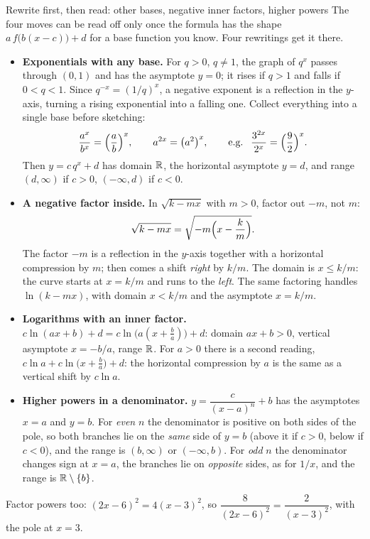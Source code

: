 \begin{rulebox}{Rewrite first, then read: other bases, negative inner factors, higher powers}
The four moves can be read off only once the formula has the shape
$a\,f\bigl(b(x-c)\bigr)+d$ for a base function you know. Four rewritings
get it there.
\begin{itemize}[leftmargin=1.6em,itemsep=0.3ex]
  \item \textbf{Exponentials with any base.} For $q>0$, $q\neq1$, the graph
        of $q^{x}$ passes through $(0,1)$ and has the asymptote $y=0$; it
        rises if $q>1$ and falls if $0<q<1$. Since $q^{-x}=(1/q)^{x}$, a
        negative exponent is a reflection in the $y$-axis, turning a rising
        exponential into a falling one. Collect everything into a single
        base before sketching:
        \[
          \frac{a^{x}}{b^{x}}=\Bigl(\frac{a}{b}\Bigr)^{x},\qquad
          a^{2x}=\bigl(a^{2}\bigr)^{x},\qquad
          \text{e.g. }\ \frac{3^{2x}}{2^{x}}=\Bigl(\frac{9}{2}\Bigr)^{x}.
        \]
        Then $y=c\,q^{x}+d$ has domain $\mathbb{R}$, the horizontal asymptote
        $y=d$, and range $(d,\infty)$ if $c>0$, $(-\infty,d)$ if $c<0$.
  \item \textbf{A negative factor inside.} In $\sqrt{k-mx}$ with $m>0$,
        factor out $-m$, not $m$:
        \[
          \sqrt{k-mx}=\sqrt{-m\Bigl(x-\frac{k}{m}\Bigr)} .
        \]
        The factor $-m$ is a reflection in the $y$-axis together with a
        horizontal compression by $m$; then comes a shift \emph{right} by
        $k/m$. The domain is $x\le k/m$: the curve starts at $x=k/m$ and
        runs to the \emph{left}. The same factoring handles $\ln(k-mx)$,
        with domain $x<k/m$ and the asymptote $x=k/m$.
  \item \textbf{Logarithms with an inner factor.}
        $c\ln(ax+b)+d=c\ln\bigl(a(x+\tfrac{b}{a})\bigr)+d$: domain
        $ax+b>0$, vertical asymptote $x=-b/a$, range $\mathbb{R}$. For $a>0$ there
        is a second reading, $c\ln a+c\ln\bigl(x+\tfrac{b}{a}\bigr)+d$: the
        horizontal compression by $a$ is the same as a vertical shift by
        $c\ln a$.
  \item \textbf{Higher powers in a denominator.} $y=\dfrac{c}{(x-a)^{n}}+b$
        has the asymptotes $x=a$ and $y=b$. For \emph{even} $n$ the
        denominator is positive on both sides of the pole, so both branches
        lie on the \emph{same} side of $y=b$ (above it if $c>0$, below if
        $c<0$), and the range is $(b,\infty)$ or $(-\infty,b)$. For
        \emph{odd} $n$ the denominator changes sign at $x=a$, the branches
        lie on \emph{opposite} sides, as for $1/x$, and the range is
        $\mathbb{R}\setminus\{b\}$.
\end{itemize}
Factor powers too: $(2x-6)^{2}=4(x-3)^{2}$, so
$\dfrac{8}{(2x-6)^{2}}=\dfrac{2}{(x-3)^{2}}$, with the pole at $x=3$.
\end{rulebox}

